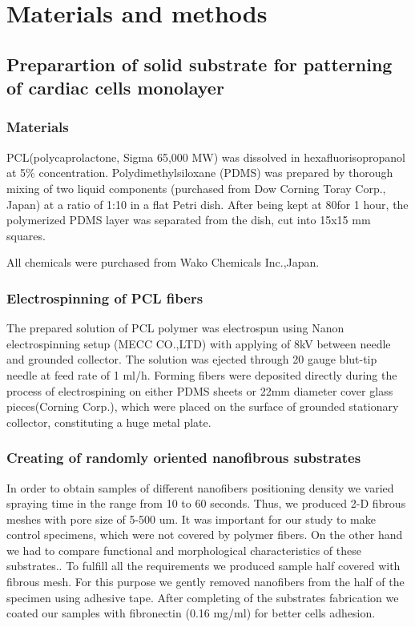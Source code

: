 \section{Materials and methods}
\label{sec:methods}

\subsection{Preparartion of solid substrate for patterning of cardiac cells monolayer}
\subsubsection{Materials}
	\label{sec:specimen_preparation_electrospinning}


PCL(polycaprolactone, Sigma 65,000 MW) was dissolved in hexafluorisopropanol at 5\% concentration.  
Polydimethylsiloxane (PDMS) was prepared by thorough mixing of two liquid components (purchased from Dow Corning Toray Corp., Japan) at a ratio of 1:10 in a flat Petri dish.
 After being kept at 80\gc\space for 1 hour, the polymerized PDMS layer was separated from the dish, cut into 15x15 mm squares.

All chemicals were purchased from Wako Chemicals Inc.,Japan.
\subsubsection{Electrospinning of PCL fibers}
The prepared solution of PCL polymer was electrospun using Nanon electrospinning setup (MECC CO.,LTD) with applying of 8kV between needle and grounded collector.
 The solution was ejected through 20 gauge blut-tip needle at feed rate of 1 ml/h. 
 Forming fibers were deposited directly during the process of electrospining on either PDMS sheets or 22mm diameter cover glass pieces(Corning Corp.), which were placed on the surface of grounded stationary collector, constituting a huge metal plate.    
\subsubsection{Creating of randomly oriented nanofibrous substrates}
In order to obtain samples of different nanofibers positioning density we varied spraying time in the range from 10 to 60 seconds.
Thus, we produced 2-D fibrous meshes with pore size of 5-500 um. 
It was important for our study to make control specimens, which were not covered by polymer fibers.
On the other hand we had to compare functional and morphological characteristics of these substrates..
To fulfill all the requirements we produced sample half covered with fibrous mesh.
For this purpose we gently removed nanofibers from the half of the specimen using adhesive tape.
After completing of the substrates fabrication we coated our samples with fibronectin (0.16 mg/ml) for better cells adhesion.
